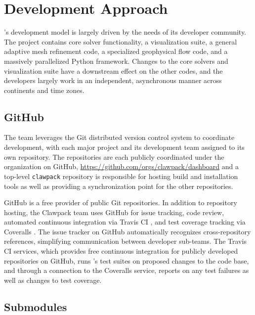 %
%
%

\section{Development Approach}

\clawpack's development model is largely driven by the needs of its
developer community.  The \clawpack project contains core solver
functionality, a visualization suite, a general adaptive mesh
refinement code, a specialized geophysical flow code, and a
massively parallelized Python framework.  Changes to the core solvers
and visualization suite have a downstream effect on the other codes,
and the developers largely work in an independent, asynchronous manner
across continents and time zones. 

\subsection{GitHub}

The \clawpack team leverages the Git distributed version control system
to coordinate development, with each major project and its development
team assigned to its own repository.  The repositories are each
publicly coordinated under the \clawpack organization on GitHub, 
\url{https://github.com/orgs/clawpack/dashboard} and a
top-level \texttt{clawpack} repository is responsible for hosting
build and installation tools as well as providing a synchronization
point for the other repositories.

GitHub is a free provider of public Git repositories.  In addition to
repository hosting, the Clawpack team uses GitHub for issue tracking,
code review, automated continuous integration via Travis CI \cite{travis}, 
and test coverage tracking via Coveralls \cite{coveralls}.  
The issue tracker on GitHub
automatically recognizes cross-repository references, simplifying
communication between \clawpack developer sub-teams.  The Travis CI
services, which provides free continuous integration for publicly
developed repositories on GitHub, runs \clawpack's test suites on
proposed changes to the code base, and through a connection to
the Coveralls service, reports on any test failures as well as changes
to test coverage.

\subsection{Submodules}

